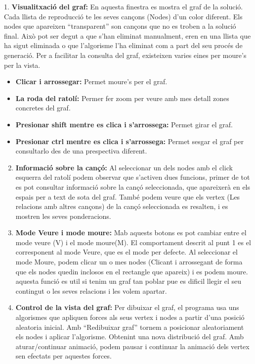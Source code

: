\documentclass[letterpaper,10pt,oneside]{sphinxmanual}
\begin{document}
1. \textbf{Visualitxació del graf:} En aquesta finestra es mostra el graf de la solució. Cada llista de reproducció te les seves cançons (Nodes) d'un color diferent. Els nodes que apareixen ``transparent'' son cançons que no es troben a la solució final. Això pot ser degut a que s'han eliminat manualment, eren en una llista que ha sigut eliminada o que l'algorisme l'ha eliminat com a part del seu procés de generació.
Per a facilitar la consulta del graf, existeixen varies eines per moure's per la vista.
\begin{itemize}
\item {} 
\textbf{Clicar i arrossegar:} Permet moure's per el graf.

\item {} 
\textbf{La roda del ratolí:} Permer fer zoom per veure amb mes detall zones concretes del graf.

\item {} 
\textbf{Presionar shift mentre es clica i s'arrossega:} Permet girar el graf.

\item {} 
\textbf{Presionar ctrl mentre es clica i s'arrossega:} Permet sesgar el graf per consultarlo des de una prespectiva diferent.

\end{itemize}
\begin{enumerate}
\setcounter{enumi}{1}
\item {} 
\textbf{Informació sobre la cançó:} Al seleccionar un dels nodes amb el click esquerra del ratolí podem observar que s'activen dues funcions, primer de tot es pot consultar informació sobre la cançó seleccionada, que apareixerà en els espais per a text de sota del graf. També podem veure que els vertex (Les relacions amb altres cançons) de la cançó seleccionada es resalten, i es mostren les seves ponderacions.

\item {} 
\textbf{Mode Veure i mode moure:} Mab aquests botons es pot cambiar entre el mode veure (V) i el mode moure(M). El comportament descrit al punt 1 es el corresponent al mode Veure, que es el mode per defecte. Al seleccionar el mode Moure, podem clicar un o mes nodes (Clicant i arrossegant de forma que els nodes quedin inclosos en el rectangle que apareix) i es podem moure. aquesta funció es util si tenim un graf tan poblar pue es dificil llegir el seu contingut o les seves relacions i les volem apartar.

\item {} 
\textbf{Control de la vista del graf:} Per dibuixar el graf, el programa usa uns algorismes que apliquen forces als seus vertex i nodes a partir d'una posició aleatoria inicial. Amb ``Redibuixar graf'' tornem a posicionar aleatoriament els nodes i aplicar l'algorisme. Obtenint una nova distribució del graf. Amb aturar/continuar animació, podem pausar i continuar la animació dels vertex sen efectats per aquestes forces.

\end{enumerate}
\end{document}
